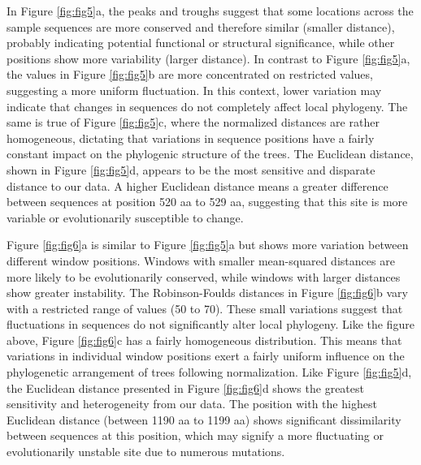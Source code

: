 In Figure \ref{fig:fig5}a, the peaks and troughs suggest that some locations across the sample sequences are more conserved and therefore similar (smaller distance), probably indicating potential functional or structural significance, while other positions show more variability (larger distance). In contrast to Figure \ref{fig:fig5}a, the values in Figure \ref{fig:fig5}b are more concentrated on restricted values, suggesting a more uniform fluctuation. In this context, lower variation may indicate that changes in sequences do not completely affect local phylogeny. The same is true of Figure \ref{fig:fig5}c, where the normalized distances are rather homogeneous, dictating that variations in sequence positions have a fairly constant impact on the phylogenic structure of the trees. The Euclidean distance, shown in Figure \ref{fig:fig5}d, appears to be the most sensitive and disparate distance to our data. A higher Euclidean distance means a greater difference between sequences at position 520 aa to 529 aa, suggesting that this site is more variable or evolutionarily susceptible to change.

Figure \ref{fig:fig6}a is similar to Figure \ref{fig:fig5}a but shows more variation between different window positions. Windows with smaller mean-squared distances are more likely to be evolutionarily conserved, while windows with larger distances show greater instability. The Robinson-Foulds distances in Figure \ref{fig:fig6}b vary with a restricted range of values (50 to 70). These small variations suggest that fluctuations in sequences do not significantly alter local phylogeny. Like the figure above, Figure \ref{fig:fig6}c has a fairly homogeneous distribution. This means that variations in individual window positions exert a fairly uniform influence on the phylogenetic arrangement of trees following normalization. Like Figure \ref{fig:fig5}d, the Euclidean distance presented in Figure \ref{fig:fig6}d shows the greatest sensitivity and heterogeneity from our data. The position with the highest Euclidean distance (between 1190 aa to 1199 aa) shows significant dissimilarity between sequences at this position, which may signify a more fluctuating or evolutionarily unstable site due to numerous mutations.

